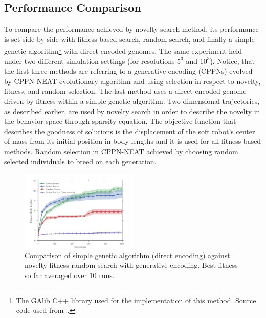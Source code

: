 \documentclass{sig-alternate}
\begin{document}
\subsection{Performance Comparison}

To compare the performance achieved by novelty search method, its performance is set side by side with fitness based search, random search, and finally a simple genetic algorithm\footnote{The GAlib C++ library \cite{wall1996galib} used for the implementation of this method. Source code used from~\cite{cheney2013unshackling}.} with direct encoded genomes. The same experiment held under two different simulation settings (for resolutions $5^3$ and $10^3$). Notice, that the first three methods are referring to a generative encoding (CPPNs) evolved by CPPN-NEAT evolutionary algorithm and using selection in respect to novelty, fitness, and random selection. The last method uses a direct encoded genome driven by fitness within a simple genetic algorithm. Two dimensional trajectories, as described earlier, are used by novelty search in order to describe the novelty in the behavior space through sparsity equation. The objective function that describes the goodness of solutions is the displacement of the soft robot's center of mass from its initial position in body-lengths and it is used for all fitness based methods. Random selection in CPPN-NEAT achieved by choosing random selected individuals to breed on each generation.

\begin{figure}[t!]
\centering
\includegraphics[width=0.5\textwidth]{../Figures/Results/FitvsNovVsDirSize10.pdf}
\caption{Comparison of simple genetic algorithm (direct encoding) against novelty-fitness-random search with generative encoding. Best fitness so far averaged over $10$ runs.}
\label{fig:FitvsNovVsDirSize10}
\end{figure} 
\end{document}
